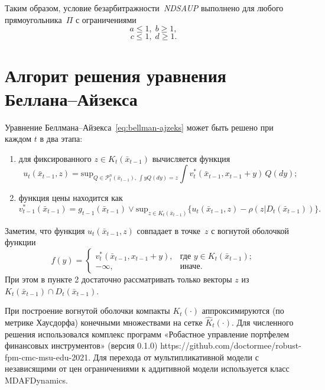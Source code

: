 \documentclass[a4paper, 12pt]{article}
\theoremstyle{def}
\theoremstyle{th}
\theoremstyle{rem}
\begin{document}
    Таким образом, условие безарбитражности~\textit{NDSAUP} выполнено для любого прямоугольника~$\Pi$ с ограничениями
    $$
        a \leqslant 1,\; b \geqslant 1,
    $$
    $$
        c \leqslant 1,\; d \geqslant 1.
    $$

    
    \section{Алгорит решения уравнения Беллана--Айзекса}

    Уравнение Беллмана--Айзекса~\eqref{eq:bellman-ajzeks} может быть решено при каждом $t$ в два этапа:
    \begin{enumerate}
        \item для фиксированного $z \in K_t(\bar x_{t-1})$ вычисляется функция
        \begin{equation}
            u_t(\bar x_{t-1}, z) = \mathrm{sup}_{Q\in\mathcal{P}_t^n(\bar x_{t-1}),\, \int yQ(dy)=z}\int v_t^*(\bar x_{t-1}, x_{t-1} + y)\,Q(dy);
        \end{equation}
        \item функция цены находится как
        \begin{equation}
            v_{t-1}^*(\bar x_{t-1}) = g_{t-1}(\bar x_{t-1}) \lor \mathrm{sup}_{z \in K_t(\bar x_{t-1})} \{u_t(\bar x_{t-1}, z) - \rho(z|D_t(\bar x_{t-1})) \}.
        \end{equation}
    \end{enumerate}

    Заметим, что функция $u_t(\bar x_{t-1}, z)$ совпадает в точке~$z$ с вогнутой оболочкой функции
    \begin{equation}
        f(y) = 
        \begin{cases}
            v_t^*(\bar x_{t-1}, x_{t-1} + y),&\mbox{где $y \in K_t(\bar x_{t-1})$};\\
            -\infty, & \mbox{иначе}.
        \end{cases}
    \end{equation}
    При этом в пункте 2 достаточно рассматривать только векторы $z$ из $K_t(\bar x_{t-1}) \cap D_t(\bar x_{t-1})$.

    При построение вогнутой оболочки компакты $K_t(\cdot)$ аппроксимируются (по метрике Хаусдорфа) конечными множествами на сетке $\hat K_t(\cdot)$. Для численного решения использовался комплекс программ «Робастное управление портфелем финансовых инструментов» (версия 0.1.0) https://github.com/doctormee/robust-fpm-cmc-msu-edu-2021. Для перехода от мультипликативной модели с независящими от цен ограничениями к аддитивной модели используется класс MDAFDynamics.
\end{document}
